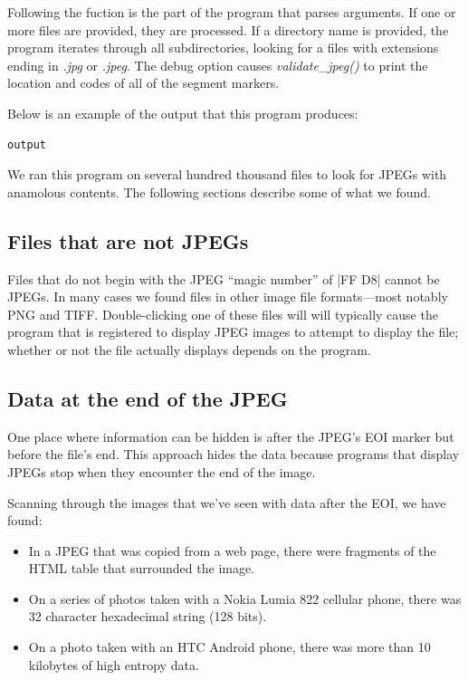 Following the fuction is the part of the program that parses
arguments. If one or more files are provided, they are processed. If a directory name is provided, the program iterates
through all subdirectories, looking for a files with extensions ending
in \emph{.jpg} or \emph{.jpeg}. The debug option causes
\emph{validate\_jpeg()} to print the location and codes of all of the segment markers.

Below is an example of the output that this program produces:

\begin{Verbatim}
output
\end{Verbatim}

We ran this program on several hundred thousand files to look for
JPEGs with anamolous contents. The following sections describe some of
what we found.

\subsection{Files that are not JPEGs}

Files that do not begin with the JPEG ``magic number'' of |FF D8|
cannot be JPEGs. In many cases we found files in other image file
formats---most notably PNG and TIFF. Double-clicking one of these
files will will typically cause the program that is registered to
display JPEG images to attempt to display the file; whether or not the
file actually displays depends on the program. 

\subsection{Data at the end of the JPEG}

One place where information can be hidden is after the JPEG's EOI
marker but before the file's end. This approach hides the data because
programs that display JPEGs stop when they encounter the end of the
image.  

Scanning through the images that we've seen with data after the EOI,
we have found:

\begin{itemize}
\item In a JPEG that was copied from a web page, there were fragments
  of the HTML table that surrounded the image.
\item On a series of photos taken with a Nokia Lumia 822 cellular phone,
  there was 32 character hexadecimal string (128 bits).
\item On a photo taken with an HTC Android phone, there was more than
  10 kilobytes of high entropy data.
\end{itemize}



